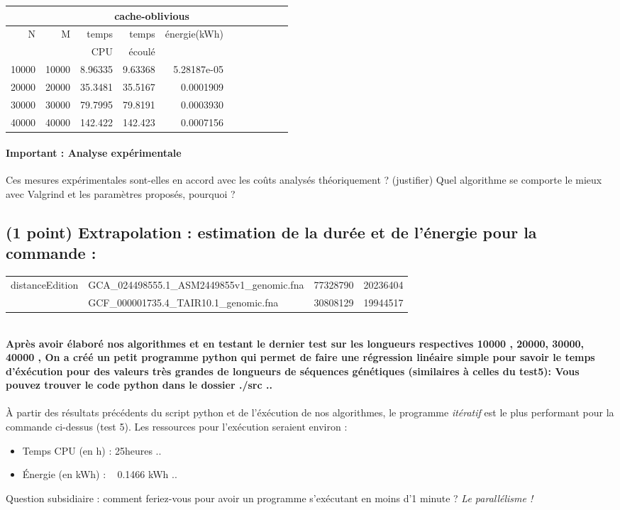 \documentclass[10pt,a4paper]{article}
\begin{document}
\begin{tabular}{|r|r||r|r|r||r|r|r||r|r|r||}
  \hline
   \multicolumn{2}{|c||}{ } 
   & \multicolumn{3}{c||}{cache-oblivious}
   \\ \hline
N & M 

& temps   & temps & énergie(kWh)       %
\\
& 

& CPU     & écoulé&               %
\\ \hline
\hline
10000 & 10000 

& 8.96335 & 9.63368  & 5.28187e-05  %
\\ \hline
20000 & 20000 

& 35.3481 & 35.5167 & 0.0001909  %
\\ \hline
30000 & 30000 

& 79.7995 & 79.8191 & 0.0003930  %
\\ \hline
40000 & 40000 

& 142.422 & 142.423 & 0.0007156  %
\\ \hline
\hline
\end{tabular}

\paragraph{Important : Analyse expérimentale}
Ces mesures expérimentales sont-elles en accord avec les coûts analysés théoriquement ? (justifier)
Quel algorithme se comporte le mieux avec Valgrind et les paramètres proposés, pourquoi ?

\subsection{(1 point) Extrapolation : estimation de la durée et de l'énergie pour la commande :}
\begin{tabular}{llll}
    distanceEdition & GCA\_024498555.1\_ASM2449855v1\_genomic.fna & 77328790 & 20236404 \\
    & GCF\_000001735.4\_TAIR10.1\_genomic.fna & 30808129 & 19944517
\end{tabular}

\\ \textbf{Après avoir élaboré nos algorithmes et en testant le dernier test sur les longueurs respectives 10000 , 20000, 30000, 40000 , On a créé un petit programme python
qui permet de faire une régression linéaire simple pour savoir le temps d'éxécution pour des valeurs très grandes de longueurs de séquences génétiques (similaires à celles du test5): Vous pouvez trouver
le code python dans le dossier ./src .. } \\
\\ À partir des résultats précédents du script python et de l'éxécution de nos algorithmes, le programme \emph{itératif} est le plus performant pour la commande ci-dessus (test 5). Les ressources pour l'exécution seraient environ :
\begin{itemize}
    \item Temps CPU (en h) : 25heures .. 
    \item Énergie (en kWh) : ~ 0.1466 kWh ..  
\end{itemize}

Question subsidiaire : comment feriez-vous pour avoir un programme s'exécutant en moins d'1 minute ?
\emph{Le parallélisme ! }
\end{document}
